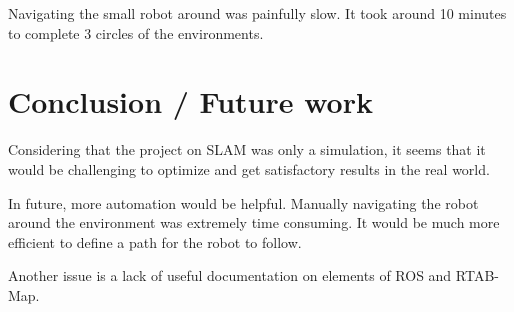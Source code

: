 \documentclass[10pt,journal,compsoc]{IEEEtran}
\begin{document}
Navigating the small robot around was painfully slow. It took around 10 minutes to complete 3 circles of the environments.

\section{Conclusion / Future work}
Considering that the project on SLAM was only a simulation, it seems that it would be challenging to optimize and get satisfactory results in the real world.

In future, more automation would be helpful. Manually navigating the robot around the environment was extremely time consuming. It would be much more efficient to define a path for the robot to follow.

Another issue is a lack of useful documentation on elements of ROS and RTAB-Map.
\end{document}
